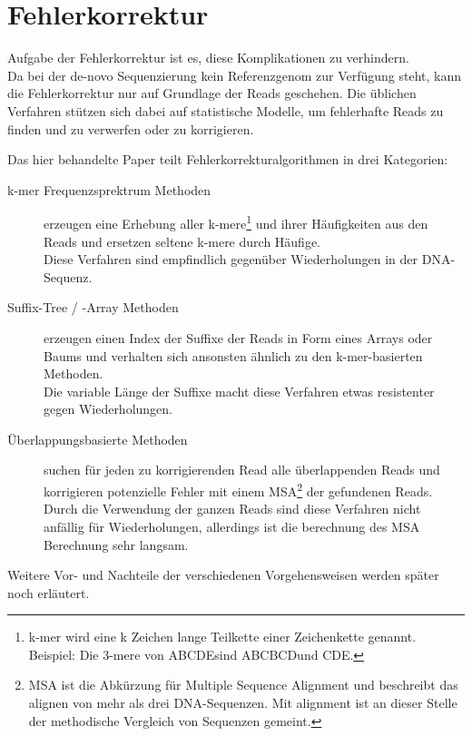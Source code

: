 \section{Fehlerkorrektur}
\label{s:error-correction} 

Aufgabe der Fehlerkorrektur ist es, diese Komplikationen zu verhindern. \\
Da bei der de-novo Sequenzierung kein Referenzgenom zur Verfügung steht, kann die Fehlerkorrektur nur auf Grundlage der Reads geschehen.
Die üblichen Verfahren stützen sich dabei auf statistische Modelle, um fehlerhafte Reads zu finden und zu verwerfen oder zu korrigieren.

Das hier behandelte Paper teilt Fehlerkorrekturalgorithmen in drei Kategorien:
\begin{description}
	\item[k-mer Frequenzsprektrum Methoden] erzeugen eine Erhebung aller k-mere\footnote{k-mer wird eine k Zeichen lange Teilkette einer Zeichenkette genannt. Beispiel: Die 3-mere von \glqq ABCDE\grqq sind \glqq ABC\grqq \glqq BCD\grqq und \glqq CDE\grqq.}
	und ihrer Häufigkeiten aus den Reads und ersetzen seltene k-mere durch Häufige. \\
		Diese Verfahren sind empfindlich gegenüber Wiederholungen in der DNA-Sequenz.
	\item[Suffix-Tree / -Array Methoden] erzeugen einen Index der Suffixe der Reads in Form eines Arrays oder Baums und verhalten sich ansonsten ähnlich zu den k-mer-basierten Methoden. \\
		Die variable Länge der Suffixe macht diese Verfahren etwas resistenter gegen Wiederholungen.
	\item[Überlappungsbasierte Methoden] suchen für jeden zu korrigierenden Read alle überlappenden Reads und korrigieren potenzielle Fehler mit einem MSA\footnote{MSA ist die Abkürzung für Multiple Sequence Alignment und beschreibt das alignen von mehr als drei DNA-Sequenzen. Mit alignment ist an dieser Stelle der methodische Vergleich von Sequenzen gemeint.} %
 der gefundenen Reads. \\
		Durch die Verwendung der ganzen Reads sind diese Verfahren nicht anfällig für Wiederholungen, allerdings ist die berechnung des MSA Berechnung sehr langsam.
\end{description}
Weitere Vor- und Nachteile der verschiedenen Vorgehensweisen werden später noch erläutert. %
